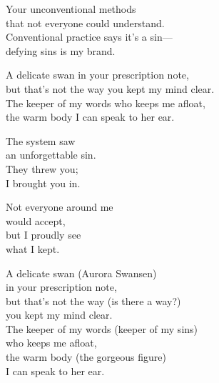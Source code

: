 \begin{lyrics}
Your unconventional methods\\
that not everyone could understand.\\
Conventional practice says it’s a sin—\\
defying sins is my brand.

A delicate swan in your prescription note,\\
but that’s not the way you kept my mind clear.\\
The keeper of my words who keeps me afloat,\\
the warm body I can speak to her ear.

The system saw\\
an unforgettable sin.\\
They threw you;\\
I brought you in.

Not everyone around me\\
would accept,\\
but I proudly see\\
what I kept.

A delicate swan (Aurora Swansen)\\
in your prescription note,\\
but that’s not the way (is there a way?)\\
you kept my mind clear.\\
The keeper of my words (keeper of my sins)\\
who keeps me afloat,\\
the warm body (the gorgeous figure)\\
I can speak to her ear.
\end{lyrics}

